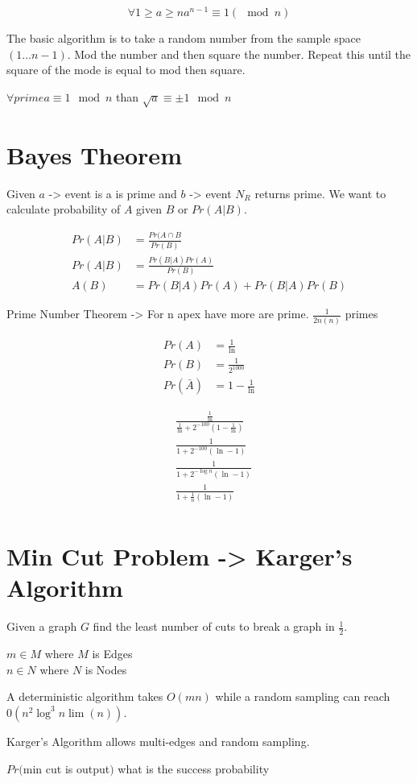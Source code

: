 \[
\forall 1 \geq a \geq n a^{n - 1} \equiv 1 (\mod n)
\]

The basic algorithm is to take a random number from the sample space $(1...n - 1)$. Mod the number and then square the number. Repeat this until the square of the mode is equal to mod then square.


$\forall prime a \equiv 1 \mod n$ than
$\sqrt{a} \equiv \pm 1 \mod n$


\section*{Bayes Theorem}
Given $a$ -> event is a is prime and $b$ -> event $N_R$ returns prime. We want to calculate probability of $A$ given $B$ or $Pr(A|B)$.

\[
\begin{aligned}
Pr(A|B) & = \frac{Pr(A \cap B }{Pr(B)} \\
Pr(A|B) & = \frac{Pr(B|A)Pr(A)}{Pr(B)} \\
A(B) & = Pr(B|A)Pr(A) + Pr(B|A)Pr(B)
\end{aligned}
\]

Prime Number Theorem -> For n apex have more are prime. $\frac{1}{2n(n)}$ primes

\[
\begin{aligned}
Pr(A) & =\frac{1}{\ln} \\
Pr(B) & =\frac{1}{2^1000} \\
Pr(\bar{A}) & = 1 - \frac{1}{\ln}
\end{aligned}
\]

\[
\begin{aligned}
& \frac{\frac{1}{\ln}}{ \frac{1}{\ln} + 2 ^{-100} ( 1 - \frac{1}{\ln} )} \\
& \frac{1}{1+ 2^{-100}(\ln-1)} \\
& \frac{1}{1+ 2^{-\log n}(\ln-1)} \\
& \frac{1}{1+ \frac{1}{n}(\ln-1)} \\
\end{aligned}
\]

\section*{Min Cut Problem -> Karger's Algorithm}
Given a graph $G$ find the least number of cuts to break a graph in $\frac{1}{2}$.

$m \in M$ where $M$ is Edges \\
$n \in N$ where $N$ is Nodes

A deterministic algorithm takes $O(mn)$ while a random sampling can reach $0(n^2\log^3n\lim(n))$.

Karger's Algorithm allows multi-edges and random sampling.

$Pr($min cut is output$)$ what is the success probability